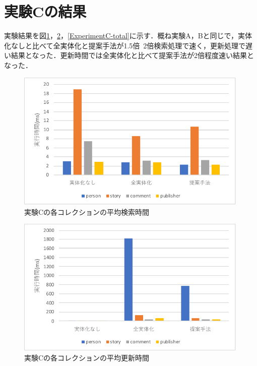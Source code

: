 \documentclass[a4paper,11pt]{ujreport}
\begin{document}
\section{実験Cの結果}
実験結果を図\ref{ExperimentC-find}，\ref{ExperimentC-update}，\ref{ExperimentC-total}に示す．概ね実験A，Bと同じで，実体化なしと比べて全実体化と提案手法が1.5倍~2倍検索処理で速く，更新処理で遅い結果となった．更新時間では全実体化と比べて提案手法が2倍程度速い結果となった．
\begin{figure}[htbp]
	\begin{center}
		\includegraphics[width=30em]{src/ExperimentC-find.pdf} %
	\end{center}
	\caption{実験Cの各コレクションの平均検索時間}
	\label{ExperimentC-find}
\end{figure}
\begin{figure}[htbp]
	\begin{center}
		\includegraphics[width=30em]{src/ExperimentC-update.pdf} %
	\end{center}
	\caption{実験Cの各コレクションの平均更新時間}
	\label{ExperimentC-update}
\end{figure}
\end{document}
